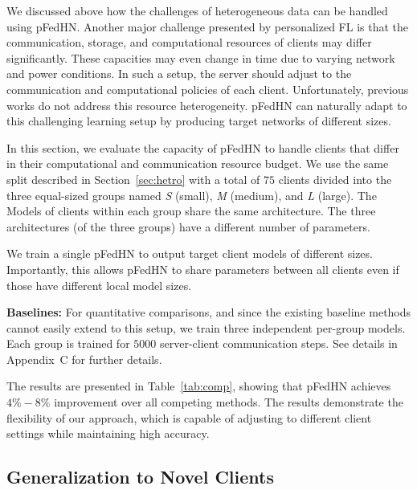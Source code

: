 \documentclass{article}
\newcommand\ourmethod{pFedHN}
\begin{document}
We discussed above how the challenges of heterogeneous data can be handled using \ourmethod{}. Another major challenge presented by personalized FL is that the communication, storage, and computational resources of clients may differ significantly. These capacities may even change in time due to varying network and power conditions.
In such a setup, the server should adjust to the communication and computational policies of each client. Unfortunately, previous works do not address this resource heterogeneity. \ourmethod{} can naturally adapt to this challenging learning setup by producing target networks of different sizes. 

In this section, we evaluate the capacity of \ourmethod{} to handle clients that differ in their computational and communication resource budget. We use the same split described in Section~\ref{sec:hetro} with a total of $75$ clients divided into the three equal-sized groups named \textit{S} (small), \textit{M} (medium), and \textit{L} (large). The Models of clients within each group share the same architecture. The three architectures (of the three groups) have a different number of parameters. 

We train a single \ourmethod{} to output target client models of different sizes. Importantly, this allows \ourmethod{} to share parameters between all clients even if those have different local model sizes. 

\noindent\textbf{Baselines:} For quantitative comparisons, and since the existing baseline methods cannot easily extend to this setup, we train three independent per-group models. Each group is trained for $5000$ server-client communication steps. 
See details in Appendix~C for further details.

The results are presented in Table~\ref{tab:comp}, showing that \ourmethod{} achieves $4\%-8\%$ improvement over all competing methods. The results demonstrate the flexibility of our approach, which is capable of adjusting to different client settings while maintaining high accuracy.


\subsection{Generalization to Novel Clients}
\end{document}
